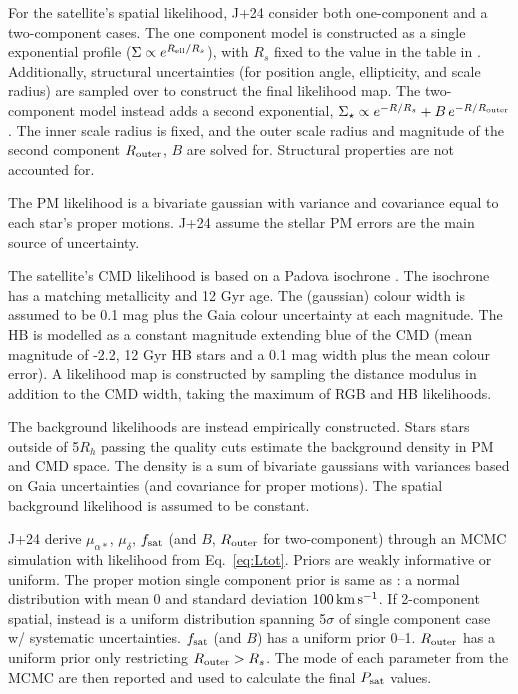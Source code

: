For the satellite's spatial likelihood, J+24 consider both one-component
and a two-component cases. The one component model is constructed as a
single exponential profile (\(\Sigma \propto e^{R_{\rm ell} / R_s}\)),
with \(R_s\) fixed to the value in the table in \citet{MV2020a}.
Additionally, structural uncertainties (for position angle, ellipticity,
and scale radius) are sampled over to construct the final likelihood
map. The two-component model instead adds a second exponential,
\(\Sigma_\star \propto e^{-R/R_s} + B\,e^{-R/R_{\rm outer}}\). The inner
scale radius is fixed, and the outer scale radius and magnitude of the
second component \(R_{\rm outer}\), \(B\) are solved for. Structural
properties are not accounted for.

The PM likelihood is a bivariate gaussian with variance and covariance
equal to each star's proper motions. J+24 assume the stellar PM errors
are the main source of uncertainty.

The satellite's CMD likelihood is based on a Padova isochrone
\citep{girardi+2002}. The isochrone has a matching metallicity and 12
Gyr age. The (gaussian) colour width is assumed to be 0.1 mag plus the
Gaia colour uncertainty at each magnitude. The HB is modelled as a
constant magnitude extending blue of the CMD (mean magnitude of -2.2, 12
Gyr HB stars and a 0.1 mag width plus the mean colour error). A
likelihood map is constructed by sampling the distance modulus in
addition to the CMD width, taking the maximum of RGB and HB likelihoods.

The background likelihoods are instead empirically constructed. Stars
stars outside of 5\(R_h\) passing the quality cuts estimate the
background density in PM and CMD space. The density is a sum of
bivariate gaussians with variances based on Gaia uncertainties (and
covariance for proper motions). The spatial background likelihood is
assumed to be constant.

J+24 derive \(\mu_{\alpha*}\), \(\mu_\delta\), \(f_{\rm sat}\) (and
\(B\), \(R_{\rm outer}\) for two-component) through an MCMC simulation
with likelihood from Eq.~\ref{eq:Ltot}. Priors are weakly informative or
uniform. The proper motion single component prior is same as
\citet{MV2020a}: a normal distribution with mean 0 and standard
deviation \(100\,{\rm km\,s^{-1}}\). If 2-component spatial, instead is a uniform
distribution spanning 5\(\sigma\) of single component case w/ systematic
uncertainties. \(f_{\rm sat}\) (and \(B\)) has a uniform prior 0--1.
\(R_{\rm outer}\) has a uniform prior only restricting
\(R_{\rm outer} > R_s\). The mode of each parameter from the MCMC are
then reported and used to calculate the final \(P_{\rm sat}\) values.

